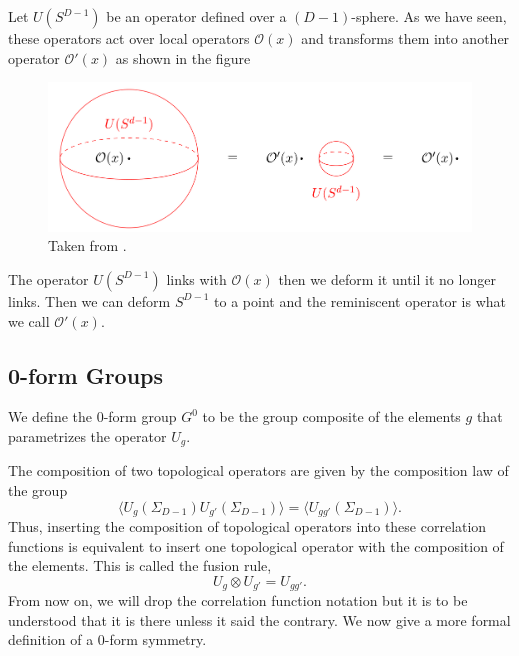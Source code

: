 \documentclass{article}
\begin{document}
Let   $U(S^{D-1})$ be an operator defined over a $(D-1)$-sphere.  As we have seen, these operators act over local operators $\mathcal{O}(x)$ and transforms them into another operator $\mathcal{O}'(x)$  as shown in the figure
\begin{figure}[H]
\centering
\includegraphics[scale=0.3]{figures/linking.png}
\caption{Taken from \cite{Bhardwaj}.}
\end{figure}
The operator $U(S^{D-1})$ links with $\mathcal{O}(x)$ then we deform it until it no longer links. Then we can deform $S^{D-1}$ to a point and the reminiscent operator is what we call $\mathcal{O}'(x).$ 
\subsection{0-form Groups}
We define the 0-form group $G^{0}$ to be the group composite of the elements $g$ that parametrizes the operator $U_g.$

The composition of two topological operators are given by the composition law of the group
\begin{equation}
	\langle U_g(\Sigma_{D-1})U_{g'}(\Sigma_{D-1})\rangle=\langle U_{gg'}(\Sigma_{D-1})\rangle.
\end{equation}
Thus, inserting the composition of topological operators into these correlation functions is equivalent to insert one topological operator with the composition of the elements. This is called the fusion rule,
\begin{equation}
	U_g\otimes U_{g'}=U_{gg'}.
\end{equation}
From now on, we will drop the correlation function notation but it is to be understood that it is there unless it said the contrary.  We now give a more formal definition of a 0-form symmetry. 
\end{document}
